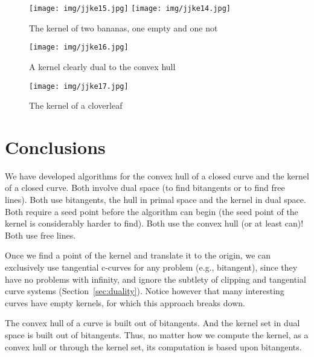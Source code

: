 \documentclass[12pt]{article}
\begin{document}
\begin{figure}
\begin{center}
\texttt{[image: img/jjke15.jpg]}
\texttt{[image: img/jjke14.jpg]}
\end{center}
\caption{The kernel of two bananas, one empty and one not}
\label{fig:banana}
\end{figure}

\begin{figure}
\begin{center}
\texttt{[image: img/jjke16.jpg]}
\end{center}
\caption{A kernel clearly dual to the convex hull}
\label{fig:kernelob1a}
\end{figure}

\begin{figure}
\begin{center}
\texttt{[image: img/jjke17.jpg]}
\end{center}
\caption{The kernel of a cloverleaf}
\label{fig:complex}
\end{figure}


\section{Conclusions}

We have developed algorithms for the convex hull of a closed curve
and the kernel of a closed curve.
Both involve dual space (to find bitangents or to find free lines).
Both use bitangents, the hull in primal space and the kernel in dual space.
Both require a seed point before the algorithm can begin
(the seed point of the kernel is considerably harder to find).
Both use the convex hull (or at least can)!
Both use free lines.

\begin{rmk}
Once we find a point of the kernel and translate it to the origin,
we can exclusively use tangential c-curves for any problem (e.g., bitangent),
since they have no problems with infinity, and ignore the subtlety of
clipping and tangential curve systems (Section~\ref{sec:duality}).
Notice however that many interesting curves have empty kernels,
for which this approach breaks down.
\end{rmk}

The convex hull of a curve is built out of bitangents.
And the kernel set in dual space is built out of bitangents.
Thus, no matter how we compute the kernel, as a convex hull
or through the kernel set, its computation is based upon bitangents.
\end{document}
